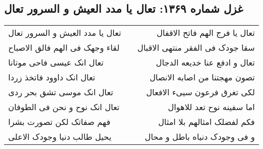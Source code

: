 \begin{center}
\section*{غزل شماره ۱۳۶۹: تعال یا مدد العیش و السرور تعال}
\label{sec:1369}
\begin{longtable}{l p{0.5cm} r}
تعال یا مدد العیش و السرور تعال
&&
تعال یا فرج الهم فاتح الاقفال
\\
لقاء وجهک فی الهم فالق الاصباح
&&
سقا جودک فی الفقر منتهی الاقبال
\\
تعال انک عیسی فاحی موتانا
&&
تعال و ادفع عنا خدیعه الدجال
\\
تعال انک داوود فاتخذ زردا
&&
تصون مهجتنا من اصابه الانصال
\\
تعال انک موسی تشق بحر ردی
&&
لکی تغرق فرعون سییء الافعال
\\
تعال انک نوح و نحن فی الطوفان
&&
اما سفینه نوح تعد للاهوال
\\
فهم صفاتک لکن تصورت بشرا
&&
فکم لفضلک امثالهم بلا امثال
\\
یحیل طالب دنیا وجودک الاعلی
&&
و فی وجودک دنیاه باطل و محال
\\
\end{longtable}
\end{center}
